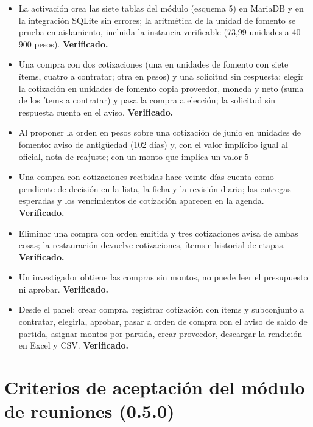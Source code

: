 \documentclass[11pt,a4paper]{article}
\begin{document}
\begin{itemize}
\item La activación crea las siete tablas del módulo (esquema 5) en MariaDB y en la integración SQLite sin errores; la aritmética de la unidad de fomento se prueba en aislamiento, incluida la instancia verificable (73,99 unidades a 40\,900 pesos). \textbf{Verificado.}
\item Una compra con dos cotizaciones (una en unidades de fomento con siete ítems, cuatro a contratar; otra en pesos) y una solicitud sin respuesta: elegir la cotización en unidades de fomento copia proveedor, moneda y neto (suma de los ítems a contratar) y pasa la compra a elección; la solicitud sin respuesta cuenta en el aviso. \textbf{Verificado.}
\item Al proponer la orden en pesos sobre una cotización de junio en unidades de fomento: aviso de antigüedad (102 días) y, con el valor implícito igual al oficial, nota de reajuste; con un monto que implica un valor 5 %
\item Una compra con cotizaciones recibidas hace veinte días cuenta como pendiente de decisión en la lista, la ficha y la revisión diaria; las entregas esperadas y los vencimientos de cotización aparecen en la agenda. \textbf{Verificado.}
\item Eliminar una compra con orden emitida y tres cotizaciones avisa de ambas cosas; la restauración devuelve cotizaciones, ítems e historial de etapas. \textbf{Verificado.}
\item Un investigador obtiene las compras sin montos, no puede leer el presupuesto ni aprobar. \textbf{Verificado.}
\item Desde el panel: crear compra, registrar cotización con ítems y subconjunto a contratar, elegirla, aprobar, pasar a orden de compra con el aviso de saldo de partida, asignar montos por partida, crear proveedor, descargar la rendición en Excel y CSV. \textbf{Verificado.}
\end{itemize}

\section{Criterios de aceptación del módulo de reuniones (0.5.0)}
\end{document}
